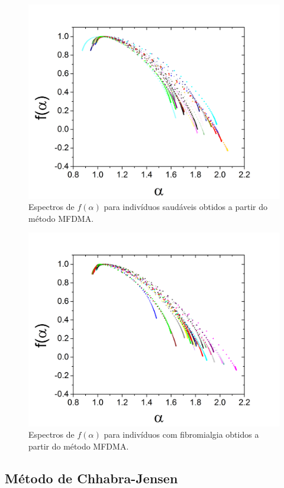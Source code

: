 \documentclass{ufscThesis}
\begin{document}
\begin{figure}[!h]
\centering
\includegraphics[scale=0.3]{h_mfdma.png}
\caption{Espectros de $f(\alpha)$ para indivíduos saudáveis obtidos a partir do método MFDMA.}
\label{h_mfdma}
\end{figure}

\begin{figure}[!h]
\centering
\includegraphics[scale=0.3]{f_mfdma.png}
\caption{Espectros de $f(\alpha)$ para indivíduos com fibromialgia obtidos a partir do método MFDMA.}
\label{f_mfdma}
\end{figure}

\subsection{Método de Chhabra-Jensen}
\end{document}
